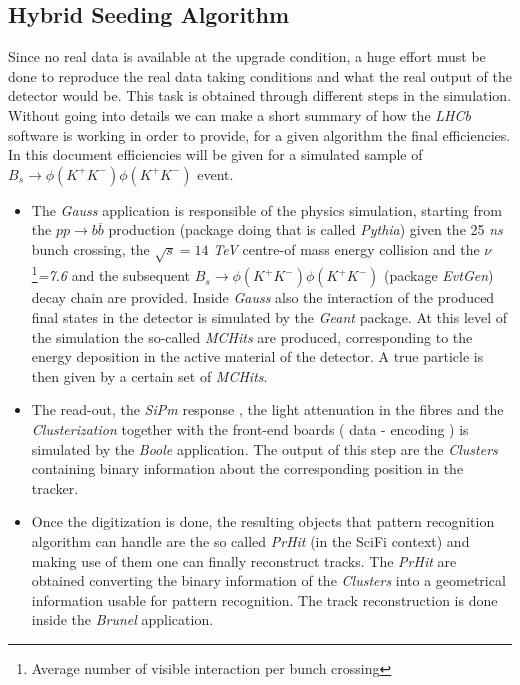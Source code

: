 \documentclass[paper=a4, fontsize=10pt]{scrartcl}
\numberwithin{equation}{section}		%
\numberwithin{figure}{section}			%
\numberwithin{table}{section}				%
\begin{document}
\subsection{Hybrid Seeding Algorithm}
Since no real data is available at the upgrade condition, a huge effort must be done to reproduce the real data taking conditions and what the real output of the detector would be. This task is obtained through different steps in the simulation. Without going into details we can make a short summary of how the \textit{LHCb} software is working in order to provide, for a given algorithm the final efficiencies. In this document efficiencies will be given for a simulated sample of  $B_s\rightarrow \phi\left( K^{+}K^{-}\right) \phi \left( K^{+}K^{-} \right)$ event.
\begin{itemize}
\item{The \textit{Gauss} application is responsible of the physics simulation, starting from the $pp\rightarrow b \overline{b}$ production (package doing that is called \textit{Pythia}) given the 25 \textit{ns} bunch crossing, the $\sqrt{s}= 14$ \textit{TeV} centre-of mass energy collision and the $\nu$\footnote{Average number of visible interaction per bunch crossing}\textit{=7.6} and the subsequent $B_s\rightarrow \phi\left( K^{+}K^{-}\right) \phi \left(K^{+} K^{-} \right)$ (package \textit{EvtGen}) decay chain are provided. Inside \textit{Gauss} also the interaction of the produced final states in the detector is simulated by the \textit{Geant} package. At this level of the simulation the so-called \textit{MCHits} are produced, corresponding to the energy deposition in the active material of the detector. A true particle is then given by a certain set of \textit{MCHits}.}
\item{The read-out, the \textit{SiPm} response , the light attenuation in the fibres and the \textit{Clusterization} together with the front-end boards ( data - encoding ) is simulated by the \textit{Boole} application. The output of this step are the \textit{Clusters} containing binary information about the corresponding position in the tracker.}
\item{Once the digitization is done, the resulting objects that pattern recognition algorithm can handle are the so called \textit{PrHit} (in the SciFi context) and making use of them one can finally reconstruct tracks. The \textit{PrHit} are obtained converting the binary information of the \textit{Clusters} into a geometrical information usable for pattern recognition. The track reconstruction is done inside the \textit{Brunel} application.}

\end{itemize}
\end{document}
